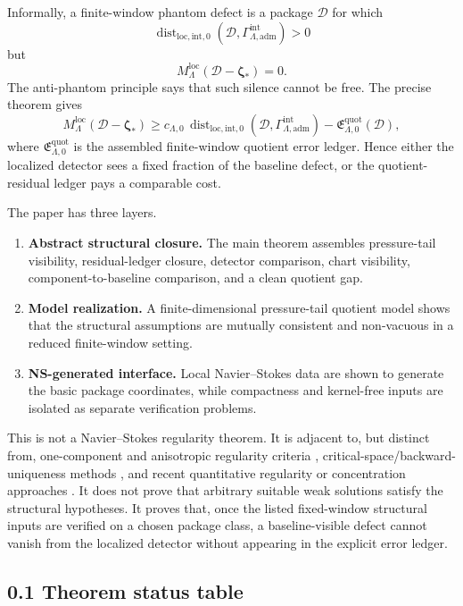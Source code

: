 \documentclass[11pt]{article}
\numberwithin{equation}{section}
\theoremstyle{definition}
\theoremstyle{remark}
\newcommand{\loc}{\mathrm{loc}}
\newcommand{\intg}{\mathrm{int}}
\newcommand{\adm}{\mathrm{adm}}
\newcommand{\quot}{\mathrm{quot}}
\newcommand{\Dist}{\operatorname{dist}}
\newcommand{\calD}{\mathcal D}
\newcommand{\bzeta}{\boldsymbol\zeta}
\begin{document}
Informally, a finite-window phantom defect is a package \(\calD\) for which
\[
        \Dist_{\loc,\intg,0}(\calD,\Gamma^{\intg}_{\Lambda,\adm})>0
\]
but
\[
        M_\Lambda^{\loc}(\calD-\bzeta_*)=0.
\]
The anti-phantom principle says that such silence cannot be free.  The precise theorem gives
\[
        M_\Lambda^{\loc}(\calD-\bzeta_*)
        \ge
        c_{\Lambda,0}\,
        \Dist_{\loc,\intg,0}(\calD,\Gamma^{\intg}_{\Lambda,\adm})
        -
        \mathfrak E^{\quot}_{\Lambda,0}(\calD),
\]
where \(\mathfrak E^{\quot}_{\Lambda,0}\) is the assembled finite-window quotient error ledger.  Hence either the localized detector sees a fixed fraction of the baseline defect, or the quotient-residual ledger pays a comparable cost.

The paper has three layers.
\begin{enumerate}[label=(\roman*)]
\item \textbf{Abstract structural closure.}  The main theorem assembles pressure-tail visibility, residual-ledger closure, detector comparison, chart visibility, component-to-baseline comparison, and a clean quotient gap.
\item \textbf{Model realization.}  A finite-dimensional pressure-tail quotient model shows that the structural assumptions are mutually consistent and non-vacuous in a reduced finite-window setting.
\item \textbf{NS-generated interface.}  Local Navier--Stokes data are shown to generate the basic package coordinates, while compactness and kernel-free inputs are isolated as separate verification problems.
\end{enumerate}

This is not a Navier--Stokes regularity theorem.  It is adjacent to, but distinct from, one-component and anisotropic regularity criteria \cite{KukavicaZiane2006,CaoTiti2011,CheminZhang2016,CheminZhangZhang2017,HanLeiLiZhao2019,KangNguyen2023}, critical-space/backward-uniqueness methods \cite{ESS2003}, and recent quantitative regularity or concentration approaches \cite{BarkerPrange2021,AlbrittonBarkerPrange2023}.  It does not prove that arbitrary suitable weak solutions satisfy the structural hypotheses.  It proves that, once the listed fixed-window structural inputs are verified on a chosen package class, a baseline-visible defect cannot vanish from the localized detector without appearing in the explicit error ledger.

\subsection*{0.1 Theorem status table}
\end{document}
